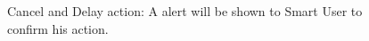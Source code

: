 \begin{figure}[H]
  \caption{Cancel and Delay action: A alert will be shown to Smart User to confirm his action.}
\end{figure}



